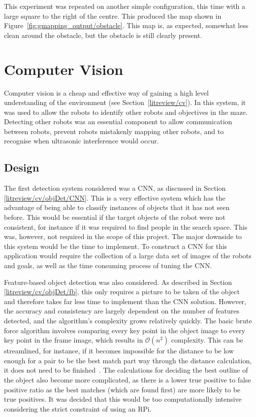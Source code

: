 This experiment was repeated on another simple configuration, this time with a large square to the right of the
centre. This produced the map shown in Figure~\ref{fig:gmapping_output/obstacle}. This map is, as expected, somewhat less clean around the obstacle, but the obstacle is still clearly present. 

\section{Computer Vision}\label{soft/cv}
Computer vision is a cheap and effective way of gaining a high level
understanding of the environment (see Section~\ref{litreview/cv}). In this system, it was used to allow the robots to
identify other robots and objectives in the maze. Detecting other
robots was an essential component to allow communication between robots,
prevent robots mistakenly mapping other robots, and to recognise when
ultrasonic interference would occur.

\subsection{Design}\label{soft/cv/design}
The first detection system considered was a CNN, as discussed in Section
\ref{litreview/cv/objDet/CNN}. This is a very effective system which has
the advantage of
being able to classify instances of objects that it has not
seen before. This would be essential if the target objects of
the robot were not consistent, for instance if it was required to find
people in the search space. This was, however, not required
in the scope of this project. The major downside to this
system would be the time to implement. To construct a CNN for
this application would require the collection of a large data
set of images of the robots and goals, as well as the time
consuming process of tuning the CNN.

Feature-based object detection was also considered. As described in
Section \ref{litreview/cv/objDet/fb}, this only requires a picture to be
taken of the object and therefore takes far less time to
implement than the CNN solution. However, the accuracy and
consistency are largely dependent on the number of features
detected, and the algorithm's complexity grows relatively
quickly. The basic brute force algorithm involves comparing
every key point in the object image to every key point in the
frame image, which results in $\mathcal{O}(n^2)$ complexity. This can be streamlined, for instance, if it becomes impossible
for the distance to be low enough for a pair to be the best
match part way through the distance calculation, it does not
need to be finished~\cite{opencv_library}. The calculations for deciding the best
outline of the object also become more complicated, as there
is a lower true positive to false positive ratio as the
best matches (which are found first) are more likely to be
true positives. It was decided that this would be too
computationally intensive considering the strict constraint of
using an RPi.

